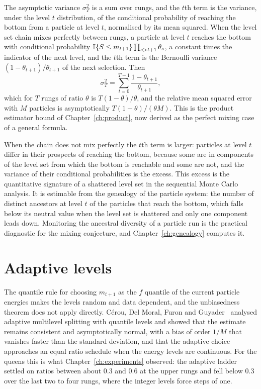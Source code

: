 The asymptotic variance $\sigma_T^2$ is a sum over rungs, and the $t$th term is the variance, under the level $t$ distribution, of the conditional probability of reaching the bottom from a particle at level $t$, normalised by its mean squared. When the level set chain mixes perfectly between rungs, a particle at level $t$ reaches the bottom with conditional probability $\mathbb{I}\{ S \le m_{t+1} \} \prod_{s > t+1} \theta_s$, a constant times the indicator of the next level, and the $t$th term is the Bernoulli variance $(1 - \theta_{t+1}) / \theta_{t+1}$ of the next selection. Then
\[
\sigma_T^2 = \sum_{t=0}^{T-1} \frac{1 - \theta_{t+1}}{\theta_{t+1}} ,
\]
which for $T$ rungs of ratio $\theta$ is $T (1 - \theta) / \theta$, and the relative mean squared error with $M$ particles is asymptotically $T(1 - \theta) / (\theta M)$. This is the product estimator bound of Chapter~\ref{ch:product}, now derived as the perfect mixing case of a general formula.

When the chain does not mix perfectly the $t$th term is larger: particles at level $t$ differ in their prospects of reaching the bottom, because some are in components of the level set from which the bottom is reachable and some are not, and the variance of their conditional probabilities is the excess. This excess is the quantitative signature of a shattered level set in the sequential Monte Carlo analysis. It is estimable from the genealogy of the particle system: the number of distinct ancestors at level $t$ of the particles that reach the bottom, which falls below its neutral value when the level set is shattered and only one component leads down. Monitoring the ancestral diversity of a particle run is the practical diagnostic for the mixing conjecture, and Chapter~\ref{ch:genealogy} computes it.

\section{Adaptive levels}

The quantile rule for choosing $m_{t+1}$ as the $f$ quantile of the current particle energies makes the levels random and data dependent, and the unbiasedness theorem does not apply directly. C\'erou, Del Moral, Furon and Guyader~\cite{CDFG} analysed adaptive multilevel splitting with quantile levels and showed that the estimate remains consistent and asymptotically normal, with a bias of order $1/M$ that vanishes faster than the standard deviation, and that the adaptive choice approaches an equal ratio schedule when the energy levels are continuous. For the queens this is what Chapter~\ref{ch:experiments} observed: the adaptive ladder settled on ratios between about $0.3$ and $0.6$ at the upper rungs and fell below $0.3$ over the last two to four rungs, where the integer levels force steps of one.

